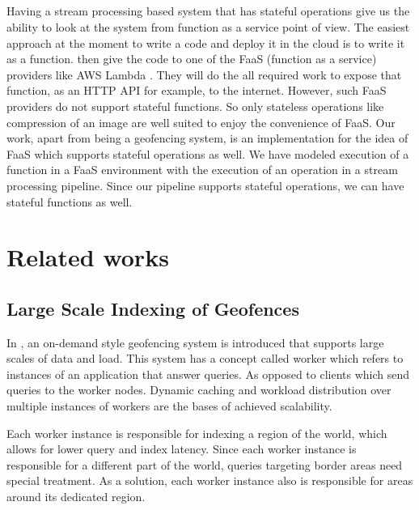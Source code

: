 \documentclass[a4]{report}
\begin{document}
    \paragraph{}
    Having a stream processing based system that has stateful operations give us the ability to look at the system from
    function as a service\cite{whatisfaas} point of view.
    The easiest approach at the moment to write a code and deploy it in the cloud is to write it as a function.
    then give the code to one of the FaaS (function as a service) providers like AWS Lambda \cite{lambda}.
    They will do the all required work to expose that function, as an HTTP API for example, to the internet.
    However, such FaaS providers do not support stateful functions.
    So only stateless operations like compression of an image are well suited to enjoy the convenience of FaaS.
    Our work, apart from being a geofencing system, is an implementation for the idea of FaaS which supports stateful operations as well.
    We have modeled execution of a function in a FaaS environment with the execution of an operation in a stream
    processing pipeline.
    Since our pipeline supports stateful operations, we can have stateful functions as well.


    \chapter{Related works}


    \section{Large Scale Indexing of Geofences}
    In \cite{Cirillo-Jacobs-Martin-Szczytowski-2014}, an on-demand style geofencing system is introduced that
    supports large scales of data and load.
    This system has a concept called worker which refers to instances of an application that answer queries.
    As opposed to clients which send queries to the worker nodes.
    Dynamic caching and workload distribution over multiple instances of workers are the bases of achieved scalability.

    Each worker instance is responsible for indexing a region of the world, which allows for lower query and index latency.
    Since each worker instance is responsible for a different part of the world, queries targeting border areas need special treatment.
    As a solution, each worker instance also is responsible for areas around its dedicated region.
\end{document}
